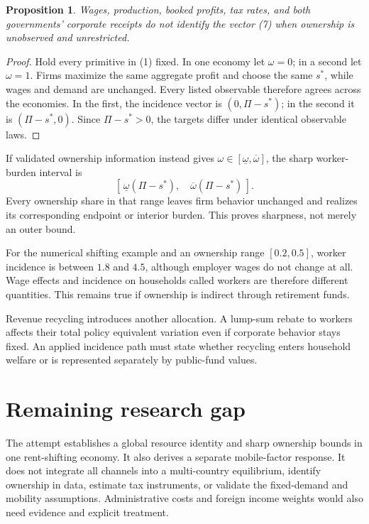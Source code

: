 \documentclass[11pt,a4paper]{article}
\newtheorem{proposition}[theorem]{Proposition}
\begin{document}
\begin{proposition}
Wages, production, booked profits, tax rates, and both governments' corporate receipts do not identify the vector (7) when ownership is unobserved and unrestricted.
\end{proposition}
\begin{proof}
Hold every primitive in (1) fixed. In one economy let $\omega=0$; in a second let $\omega=1$. Firms maximize the same aggregate profit and choose the same $s^*$, while wages and demand are unchanged. Every listed observable therefore agrees across the economies. In the first, the incidence vector is $(0,\Pi-s^*)$; in the second it is $(\Pi-s^*,0)$. Since $\Pi-s^*>0$, the targets differ under identical observable laws.
\end{proof}
If validated ownership information instead gives
$\omega\in[\underline\omega,\overline\omega]$, the sharp worker-burden interval is
\[
 [\,\underline\omega(\Pi-s^*),\quad
     \overline\omega(\Pi-s^*)\,].
 \tag{8}
\]
Every ownership share in that range leaves firm behavior unchanged and realizes its corresponding endpoint or interior burden. This proves sharpness, not merely an outer bound.

For the numerical shifting example and an ownership range $[0.2,0.5]$, worker incidence is between $1.8$ and $4.5$, although employer wages do not change at all. Wage effects and incidence on households called workers are therefore different quantities. This remains true if ownership is indirect through retirement funds.

Revenue recycling introduces another allocation. A lump-sum rebate to workers affects their total policy equivalent variation even if corporate behavior stays fixed. An applied incidence path must state whether recycling enters household welfare or is represented separately by public-fund values.
\section{Remaining research gap}
The attempt establishes a global resource identity and sharp ownership bounds in one rent-shifting economy. It also derives a separate mobile-factor response. It does not integrate all channels into a multi-country equilibrium, identify ownership in data, estimate tax instruments, or validate the fixed-demand and mobility assumptions. Administrative costs and foreign income weights would also need evidence and explicit treatment.
\end{document}

